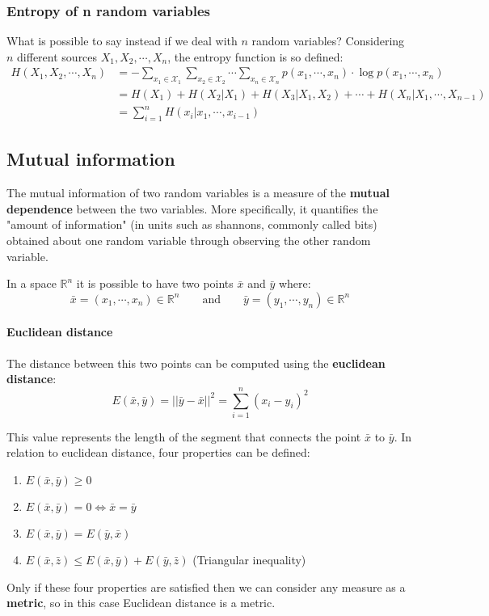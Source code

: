 \subsubsection{Entropy of n random variables} What is possible to say instead if we deal with $n$ random variables? Considering $n$ different sources $X_1, X_2, \cdots, X_n$, the entropy function is so defined:
\begin{equation*}
\begin{split}
H(X_1, X_2, \cdots, X_n) &= -\sum_{x_1 \in \mathcal{X}_1} \sum_{x_2 \in \mathcal{X}_2} \cdots \sum_{x_n \in \mathcal{X}_n} p(x_1, \cdots, x_n) \cdot \log p(x_1, \cdots, x_n)\\
&=H(X_1) + H(X_2|X_1) + H(X_3| X_1, X_2) + \cdots + H(X_n | X_1, \cdots, X_{n-1})\\
&=\sum_{i=1}^n H(x_i| x_1, \cdots, x_{i-1})
\end{split}
\end{equation*}

\subsection{Mutual information}
The mutual information of two random variables is a measure of the \textbf{mutual dependence} between the two variables. More specifically, it quantifies the "amount of information" (in units such as shannons, commonly called bits) obtained about one random variable through observing the other random variable.

In a space $\mathbb{R}^n$ it is possible to have two points $\bar{x}$ and $\bar{y}$ where:
$$\bar{x} = (x_1, \cdots, x_n) \in \mathbb{R}^n \qquad \text{and} \qquad \bar{y} = (y_1, \cdots, y_n) \in \mathbb{R}^n$$


\paragraph{Euclidean distance} The distance between this two points can be computed using the \textbf{euclidean distance}:
$$E(\bar{x}, \bar{y}) = || \bar{y} - \bar{x}||^2 = \sum_{i=1}^n (x_i - y_i)^2$$


This value represents the length of the segment that connects the point $\bar{x}$ to $\bar{y}$. In relation to euclidean distance, four properties can be defined:
\begin{enumerate}
	\item $E(\bar{x}, \bar{y}) \geq 0$
	\item $E(\bar{x}, \bar{y}) = 0 \iff \bar{x} = \bar{y}$
	\item $E(\bar{x}, \bar{y}) = E(\bar{y}, \bar{x})$
	\item $E(\bar{x}, \bar{z}) \leq E(\bar{x}, \bar{y}) + E(\bar{y}, \bar{z})$ (Triangular inequality)
\end{enumerate}
Only if these four properties are satisfied then we can consider any measure as a \textbf{metric}, so in this case Euclidean distance is a metric.

